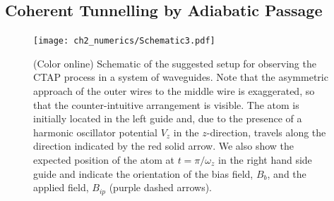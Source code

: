 \subsection{Coherent Tunnelling by Adiabatic Passage}
\label{sec:CTAP}

\begin{figure}[tb]
  \texttt{[image: ch2\_numerics/Schematic3.pdf]}
  \caption{(Color online) Schematic of the suggested setup for observing the CTAP process in a system of waveguides. Note that the asymmetric approach of the outer wires to the middle wire is exaggerated, so that the counter-intuitive arrangement is visible. The atom is initially located in the left guide and, due to the presence of a harmonic oscillator potential $V_{z}$ in the $z$-direction, travels along the direction indicated by the red solid arrow. We also show the expected position of the atom at $t=\pi/{\omega_z}$ in the right hand side guide and indicate the orientation of the bias field, $B_b$, and the applied field, $B_{ip}$ (purple dashed arrows).}
  \label{fig:Schematic}
\end{figure}


